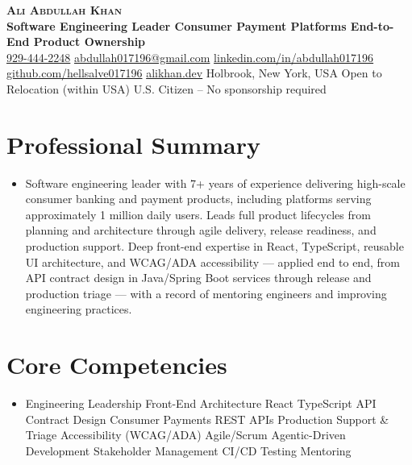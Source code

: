 \documentclass[letterpaper,10pt]{article}
\newcommand{\resumeSubHeadingListStart}{\begin{itemize}[leftmargin=0.15in, label={}]}
\newcommand{\resumeSubHeadingListEnd}{\end{itemize}}
\begin{document}
\begin{center}
    \textbf{\Huge \scshape Ali Abdullah Khan} \\ \vspace{3pt}
    \textbf{\small Software Engineering Leader \textbar{} Consumer Payment Platforms \textbar{} End-to-End Product Ownership} \\ \vspace{3pt}
    \small
    \href{tel:9294442248}{929-444-2248}
    \textbar{}
    \href{mailto:abdullah017196@gmail.com}{abdullah017196@gmail.com}
    \textbar{}
    \href{https://www.linkedin.com/in/abdullah017196}{linkedin.com/in/abdullah017196}
    \textbar{}
    \href{https://github.com/hellsalve017196}{github.com/hellsalve017196}
    \textbar{}
    \href{https://alikhan.dev}{alikhan.dev}
    \textbar{}
    Holbrook, New York, USA
    \textbar{}
    Open to Relocation (within USA)
    \textbar{}
    U.S. Citizen -- No sponsorship required
\end{center}



\section{Professional Summary}
\resumeSubHeadingListStart
  \item{\small Software engineering leader with 7+ years of experience delivering high-scale consumer banking and payment products, including platforms serving approximately 1 million daily users. Leads full product lifecycles from planning and architecture through agile delivery, release readiness, and production support. Deep front-end expertise in React, TypeScript, reusable UI architecture, and WCAG/ADA accessibility --- applied end to end, from API contract design in Java/Spring Boot services through release and production triage --- with a record of mentoring engineers and improving engineering practices.}
\resumeSubHeadingListEnd



\section{Core Competencies}
\resumeSubHeadingListStart
  \item{\small Engineering Leadership \textbar{} Front-End Architecture \textbar{} React \textbar{} TypeScript \textbar{} API Contract Design \textbar{} Consumer Payments \textbar{} REST APIs \textbar{} Production Support \& Triage \textbar{} Accessibility (WCAG/ADA) \textbar{} Agile/Scrum \textbar{} Agentic-Driven Development \textbar{} Stakeholder Management \textbar{} CI/CD \textbar{} Testing \textbar{} Mentoring}
\resumeSubHeadingListEnd
\end{document}
